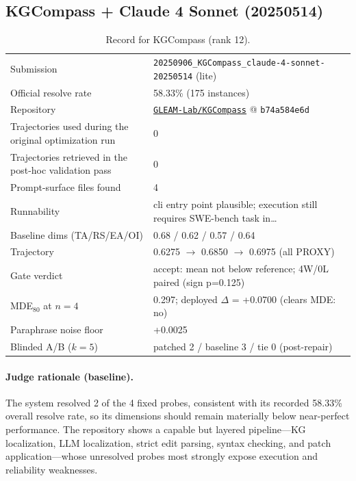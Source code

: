 \subsection{KGCompass + Claude 4 Sonnet (20250514)}
\label{app:agent12}
\begin{table}[h]\centering\scriptsize
\caption{Record for KGCompass (rank 12).}
\begin{tabular}{lp{8.2cm}}\toprule
Submission & \texttt{20250906\_\allowbreak{}KGCompass\_\allowbreak{}claude-4-sonnet-20250514} (lite) \\
Official resolve rate & 58.33\% (175 instances) \\
Repository & \href{https://github.com/GLEAM-Lab/KGCompass}{\texttt{GLEAM-Lab/KGCompass}} @ \texttt{b74a584e6d} \\
Trajectories used during the original optimization run & 0 \\
Trajectories retrieved in the post-hoc validation pass & 0 \\
Prompt-surface files found & 4 \\
Runnability & cli entry point plausible; execution still requires SWE-bench task in\ldots{} \\
Baseline dims (TA/RS/EA/OI) & 0.68 / 0.62 / 0.57 / 0.64 \\
Trajectory & 0.6275 $\to$ 0.6850 $\to$ 0.6975 (all PROXY) \\
Gate verdict & accept: mean not below reference; 4W/0L paired (sign p=0.125) \\
MDE$_{80}$ at $n{=}4$ & 0.297; deployed $\Delta$ = +0.0700 (clears MDE: no) \\
Paraphrase noise floor & +0.0025 \\
Blinded A/B ($k{=}5$) & patched 2 / baseline 3 / tie 0 (post-repair) \\
\bottomrule\end{tabular}\end{table}
\paragraph{Judge rationale (baseline).}
The system resolved 2 of the 4 fixed probes, consistent with its recorded 58.33\% overall resolve rate, so its dimensions should remain materially below near-perfect performance. The repository shows a capable but layered pipeline—KG localization, LLM localization, strict edit parsing, syntax checking, and patch application—whose unresolved probes most strongly expose execution and reliability weaknesses.
